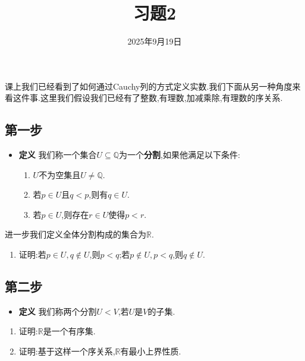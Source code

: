 \documentclass[
  a4paper,
]{ctexart}
\title{习题2}
\author{}
\date{2025年9月19日}
\providecommand{\tightlist}{\setlength{\itemsep}{0pt}\setlength{\parskip}{0pt}}
\begin{document}
%
\pagestyle{fancy}
\fancyhf{}


\renewcommand{\headrulewidth}{1pt}
\rfoot{\thepage}

课上我们已经看到了如何通过Cauchy列的方式定义实数.我们下面从另一种角度来看这件事.这里我们假设我们已经有了整数,有理数,加减乘除,有理数的序关系.

\subsection{第一步}\label{ux7b2cux4e00ux6b65}

\begin{itemize}
\tightlist
\item
  \textbf{定义}
  我们称一个集合\(U\subseteq\mathbb{Q}\)为一个\textbf{分割},如果他满足以下条件:

  \begin{enumerate}
  \def\labelenumi{\arabic{enumi}.}
  \tightlist
  \item
    \(U\)不为空集且\(U \neq \mathbb{Q}\).
  \item
    若\(p \in U\)且\(q<p\),则有\(q \in U\).
  \item
    若\(p \in U\),则存在\(r \in U\)使得\(p<r\).
  \end{enumerate}
\end{itemize}

进一步我们定义全体分割构成的集合为\(\mathbb{R}\).

\begin{enumerate}
\def\labelenumi{\arabic{enumi}.}
\tightlist
\item
  证明:若\(p \in U,q \notin U\),则\(p<q\);若\(p \notin U,p<q\),则\(q \notin U\).
\end{enumerate}

\subsection{第二步}\label{ux7b2cux4e8cux6b65}

\begin{itemize}
\tightlist
\item
  \textbf{定义} 我们称两个分割\(U<V\),若\(U\)是\(V\)的子集.
\end{itemize}

\begin{enumerate}
\def\labelenumi{\arabic{enumi}.}
\setcounter{enumi}{1}
\tightlist
\item
  证明:\(\mathbb{R}\)是一个有序集.
\item
  证明:基于这样一个序关系,\(\mathbb{R}\)有最小上界性质.
\end{enumerate}
\end{document}
